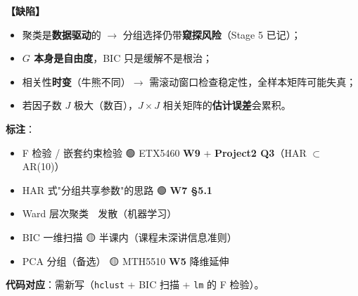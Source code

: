 \documentclass[11pt]{article}
\begin{document}
\textbf{【缺陷】}
\begin{itemize}
  \item 聚类是\textbf{数据驱动}的 \ensuremath{\rightarrow} 分组选择仍带\textbf{窥探风险}（Stage 5 已记）；
  \item \textbf{$G$ 本身是自由度}，BIC 只是缓解不是根治；
  \item 相关性\textbf{时变}（牛熊不同）\ensuremath{\rightarrow} 需滚动窗口检查稳定性，全样本矩阵可能失真；
  \item 若因子数 $J$ 极大（数百），$J\times J$ 相关矩阵的\textbf{估计误差}会累积。
\end{itemize}
\textbf{标注}：
\begin{itemize}
  \item F 检验 / 嵌套约束检验 🟢 ETX5460 \textbf{W9} + \textbf{Project2 Q3}（HAR \ensuremath{\subset} AR(10)）
  \item HAR 式"分组共享参数"的思路 🟢 \textbf{W7 \S5.1}
  \item Ward 层次聚类 🔴 发散（机器学习）
  \item BIC 一维扫描 🟡 半课内（课程未深讲信息准则）
  \item PCA 分组（备选） 🟡 MTH5510 \textbf{W5} 降维延伸
\end{itemize}
\textbf{代码对应}：需新写（\texttt{hclust} + BIC 扫描 + \texttt{lm} 的 F 检验）。
\end{document}
